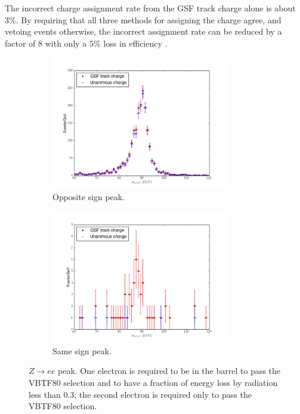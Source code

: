 The incorrect charge assignment rate from the GSF track charge alone is about
$3\%$.  By requiring that all three methods for assigning the charge agree, and
vetoing events otherwise, the incorrect assignment rate can be reduced by a
factor of 8 with only a $5\%$ loss in efficiency \cite{baisini2010electron}.

\begin{figure}[htbp]
  \centering
  \begin{subfigure}{\textwidth}
    \centering
    \includegraphics[width=0.85\textwidth]{zpeak_os}
    \caption{Opposite sign \PZ peak.}
    \label{fig:zpeak_os}
  \end{subfigure}
  \begin{subfigure}{\textwidth}
    \centering
    \includegraphics[width=0.85\textwidth]{zpeak_ss}
    \caption{Same sign \PZ peak.}
    \label{fig:zpeak_ss}
  \end{subfigure}
  \caption{ $Z\rightarrow ee$ peak. One electron is required to be in the
barrel to pass the VBTF80 selection and to have a fraction of energy loss by
radiation less than 0.3; the second electron is required only to pass the VBTF80
selection\cite{baisini2010electron}.}\label{fig:zpeak} 
\end{figure}

